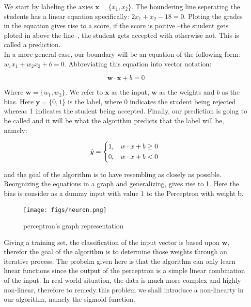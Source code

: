 We start by labeling the axies $\textbf{x} = \{x_{1}, x_{2}\}$. The boundering line seperating the students has a linear equation specifically: $2x_{1} + x_{2} - 18 = 0$. Ploting the grades in the equation gives rise to a score, if the score is poitive --the student gets ploted in above the line--, the student gets accepted with otherwise not. This is called a prediction.\\
In a more general case, our boundary will be an equation of the following form: \mbox{$w_{1}x_{1} + w_{2}x_{2} + b = 0$}.
Abbreviating this equation into vector notation:

\begin{equation}
  \label{linear}
  \textbf{w}\cdot\textbf{x} + b = 0
\end{equation}

Where $\textbf{w} = \{w_{1}, w_{2}\}$. We refer to $\textbf{x}$ as the input, $\textbf{w}$ as the weights and $b$ as the bias. Here $\textbf{y} = \{0, 1\}$ is the label, where 0 indicates the student being rejected whereas 1 indicates the student being accepted. Finally, our prediction is going to be called \mbox{} and it will be what the algorithm predicts that the label will be, namely:

\begin{equation}
  \label{y_hat}
  \hat{y} =
  \begin{dcases*}
    \text{1,}  &$w\cdot x + b \geq 0$ \\
    \text{0,}  &$w\cdot x + b < 0$
  \end{dcases*}
\end{equation}

and the goal of the algorithm is to have \mbox{} resembling \mbox{} as closely as possible. Reorgnizing the equations in a graph and generalizing, gives rise to \cref{fig:neuron}. Here the bias is consider as a dummy input with value 1 to the Perceptron with weight b.

\begin{figure}[H]
  \centering
  \texttt{[image: figs/neuron.png]}
  \caption{perceptron's graph representation}\label{fig:neuron}
\end{figure}

Giving a training set, the classification of the input vector is based upon $\textbf{w}$, therefor the goal of the algorithm is to determine those weights through an iterative process. The probelm given here is that the algorithm can only learn linear functions since the output of the perceptron is a simple linear combination of the input. In real world situation, the data is much more complex and highly non-linear, therefore to remedy this problem we shall introduce a non-linearty in our algorithm, namely the sigmoid function.


